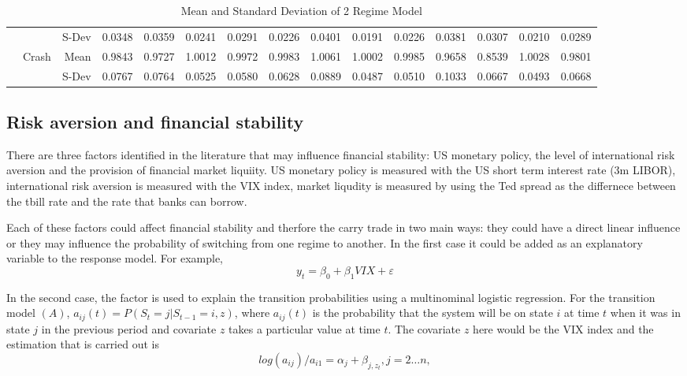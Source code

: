 \documentclass[12pt, a4paper, oneside]{article} %
\begin{document}
\begin{landscape}
\begin{table}[ht]
\begin{tabular}{llrrrrrrrrrrrrr}
 & & S-Dev &0.0348 & 0.0359 & 0.0241 & 0.0291 & 0.0226 & 0.0401 & 0.0191 & 0.0226 & 0.0381 & 0.0307 & 0.0210 & 0.0289 \\ 
  & \multirow{2}{*}{Crash}&Mean & 0.9843 & 0.9727 & 1.0012 & 0.9972 & 0.9983 & 1.0061 & 1.0002 & 0.9985 & 0.9658 & 0.8539 & 1.0028 & 0.9801 \\ 
  & & S-Dev& 0.0767 & 0.0764 & 0.0525 & 0.0580 & 0.0628 & 0.0889 & 0.0487 & 0.0510 & 0.1033 & 0.0667 & 0.0493 & 0.0668 \\ 
   \hline
\end{tabular}
\caption{Mean and Standard Deviation of 2 Regime Model}
\end{table}
\label{tabref:2stateresponse}
\end{landscape}

\subsection{Risk aversion and financial stability}
There are three factors identified in the literature that may influence financial stability:  US monetary policy, the level of international risk aversion and the provision of financial market liquiity.  US monetary policy is measured with the US short term interest rate (3m LIBOR),  international risk aversion is measured with the VIX index, market liqudity is measured by using the Ted spread as the differnece between the tbill rate and the rate that banks can borrow.   

Each of these factors could affect financial stability and therfore the carry trade in two main ways:  they could have a direct linear influence or they may influence the probability of switching from one regime to another.  In the first case it could be added as an explanatory variable to the response model. For example, 
\begin{equation}
\label{eqref:vix}
y_t = \beta_0 + \beta_1 VIX + \varepsilon
\end{equation}

In the second case, the factor is used to explain the transition probabilities using a multinominal logistic regression. For the transition model $(A)$, $a_{ij}(t) = P(S_t = j|S_{t-1} = i, z)$, where $a_{ij}(t)$ is the probability that the system will be on state $i$ at time $t$ when it was in state $j$ in the previous period and covariate $z$ takes a particular value at time $t$.  The covariate $z$ here would be the VIX index and the estimation that is carried out is 
\begin{equation}
log(a_{ij})/ a_{i1} = \alpha_j +\beta_{j,z_t}, j = 2 \dots n, 
\end{equation}
\end{document}
